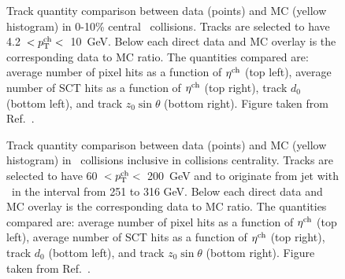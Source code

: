 \begin{figure}
\caption{Track quantity comparison between data (points) and MC (yellow histogram) in 0-10\% central \pbpb\ collisions.
Tracks are selected to have 4.2~$<\mbox{$p_{\mathrm{T}}^{\mathrm{ch}}$}<$~10~GeV.
Below each direct data and MC overlay is the corresponding data to MC ratio.
The quantities compared are: average number of pixel hits as a function of $\mbox{$\eta^{\mathrm{ch}}$}$ (top left), average number of SCT hits as a function of $\mbox{$\eta^{\mathrm{ch}}$}$ (top right), track $d_0$ (bottom left), and track $z_0 \sin\theta$ (bottom right).
Figure taken from Ref.~\cite{Sickles:2235420}.}
\label{fig:trkdataMCcomp_pbpb}
\end{figure}

\begin{figure}
\caption{Track quantity comparison between data (points) and MC (yellow histogram) in \pbpb\ collisions inclusive in collisions centrality.
Tracks are selected to have 60~$<\mbox{$p_{\mathrm{T}}^{\mathrm{ch}}$}<$~200~GeV and to originate from jet with \pt\ in the interval from 251 to 316 GeV.
Below each direct data and MC overlay is the corresponding data to MC ratio.
The quantities compared are: average number of pixel hits as a function of $\mbox{$\eta^{\mathrm{ch}}$}$ (top left), average number of SCT hits as a function of $\mbox{$\eta^{\mathrm{ch}}$}$ (top right), track $d_0$ (bottom left), and track $z_0 \sin\theta$ (bottom right).
Figure taken from Ref.~\cite{Sickles:2235420}.}
\label{fig:trkdataMCcomp_pbpb_highpt}
\end{figure}


